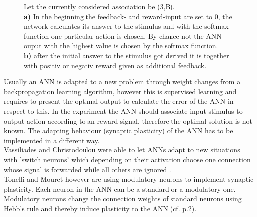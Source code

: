 \documentclass[12pt,twoside]{article}
\theoremstyle{plain}
\theoremstyle{definition}
\theoremstyle{remark}
\begin{document}
\begin{figure}[!tbp]
	\caption[Let the currently considered association be (3,B). \textbf{a)} In the beginning the feedback- and reward-input are set to 0, the network calculates its answer to the stimulus and with the softmax function one particular action is chosen. By chance not the ANN ouput with the highest value is chosen by the softmax function. \textbf{b)} after the initial answer to the stimulus got derived it is together with positiv or negativ reward given as additional feedback.]{Let the currently considered association be (3,B).\\ \textbf{a)} In the beginning the feedback- and reward-input are set to 0, the network calculates its answer to the stimulus and with the softmax function one particular action is chosen. By chance not the ANN ouput with the highest value is chosen by the softmax function.\\ \textbf{b)} after the initial answer to the stimulus got derived it is together with positiv or negativ reward given as additional feedback.\footnotemark}
	\label{fig:input}
\end{figure}

Usually an ANN is adapted to a new problem through weight changes from a backpropagation learning algorithm, however this is supervised learning and requires to present the optimal output to calculate the error of the ANN in respect to this.
In the experiment the ANN should associate input stimulus to output action according to an reward signal, therefore the optimal solution is not known. The adapting behaviour (synaptic plasticity) of the ANN has to be implemented in a different way.\\
Vassiliades and Christodoulou were able to let ANNs adapt to new situations with 'switch neurons' which depending on their activation choose one connection whose signal is forwarded while all others are ignored \cite{vassiliades2016behavioral}.\\
Tonelli and Mouret however are using modulatory neurons to implement synaptic plasticity.
Each neuron in the ANN can be a standard or a modulatory one.
Modulatory neurons change the connection weights of standard neurons using Hebb's rule and thereby induce plasticity to the ANN (cf. \cite{citeulike:12788284} p.2).\\ 
 \medskip
\end{document}
